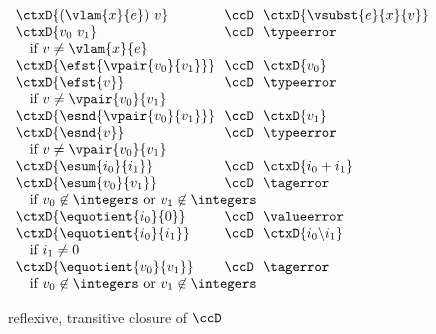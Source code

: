 \begin{flushleft}
\bigskip
{}\\
$\begin{array}{l@{~~}c@{~~}l}
  \ctxD{(\vlam{x}{e})~v} & \ccD & \ctxD{\vsubst{e}{x}{v}}
\\
  \ctxD{v_0~v_1} & \ccD & \typeerror
\\ \multicolumn{3}{l}{\mbox{\quad if $v \neq \vlam{x}{e}$}}
\\
  \ctxD{\efst{\vpair{v_0}{v_1}}} & \ccD & \ctxD{v_0}
\\
  \ctxD{\efst{v}} & \ccD & \typeerror
\\ \multicolumn{3}{l}{\mbox{\quad if $v \neq \vpair{v_0}{v_1}$}}
\\
  \ctxD{\esnd{\vpair{v_0}{v_1}}} & \ccD & \ctxD{v_1}
\\
  \ctxD{\esnd{v}} & \ccD & \typeerror
\\ \multicolumn{3}{l}{\mbox{\quad if $v \neq \vpair{v_0}{v_1}$}}
\\
  \ctxD{\esum{i_0}{i_1}} & \ccD & \ctxD{i_0 + i_1}
\\
  \ctxD{\esum{v_0}{v_1}} & \ccD & \tagerror
\\ \multicolumn{3}{l}{\mbox{\quad if $v_0 \not\in \integers$ or $v_1 \not\in \integers$}}
\\
  \ctxD{\equotient{i_0}{0}} & \ccD & \valueerror
\\
  \ctxD{\equotient{i_0}{i_1}} & \ccD & \ctxD{i_0 \backslash i_1}
\\ \multicolumn{3}{l}{\mbox{\quad if $i_1 \neq 0$}}
\\
  \ctxD{\equotient{v_0}{v_1}} & \ccD & \tagerror
\\ \multicolumn{3}{l}{\mbox{\quad if $v_0 \not\in \integers$ or $v_1 \not\in \integers$}}
\end{array}$

\medskip
{} reflexive, transitive closure of $\ccD$

\end{flushleft}
